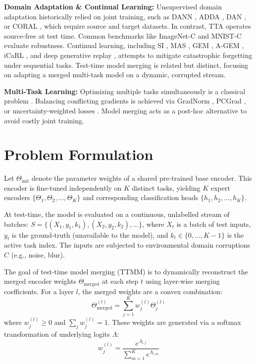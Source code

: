 \documentclass{article}
\theoremstyle{plain}
\theoremstyle{definition}
\theoremstyle{remark}
\begin{document}
\textbf{Domain Adaptation \& Continual Learning:} Unsupervised domain adaptation historically relied on joint training, such as DANN \cite{dann2016, dann_unsupervised2015}, ADDA \cite{adda2017}, DAN \cite{dan2015}, or CORAL \cite{coral2016}, which require source and target datasets. In contrast, TTA operates source-free at test time. Common benchmarks like ImageNet-C \cite{imagenetc2019} and MNIST-C \cite{mnistc2020} evaluate robustness. Continual learning, including SI \cite{si2017}, MAS \cite{mas2018}, GEM \cite{gem2017}, A-GEM \cite{agem2019}, iCaRL \cite{icarl2017}, and deep generative replay \cite{generativereplay2017}, attempts to mitigate catastrophic forgetting under sequential tasks. Test-time model merging is related but distinct, focusing on adapting a merged multi-task model on a dynamic, corrupted stream.

\textbf{Multi-Task Learning:} Optimizing multiple tasks simultaneously is a classical problem \cite{multitask1997, ruder2017}. Balancing conflicting gradients is achieved via GradNorm \cite{gradnorm2018}, PCGrad \cite{pcgrad2020}, or uncertainty-weighted losses \cite{kendall2018}. Model merging acts as a post-hoc alternative to avoid costly joint training.

\section{Problem Formulation}
Let $\Theta_{\text{init}}$ denote the parameter weights of a shared pre-trained base encoder. This encoder is fine-tuned independently on $K$ distinct tasks, yielding $K$ expert encoders $\{\Theta_1, \Theta_2, \dots, \Theta_K\}$ and corresponding classification heads $\{h_1, h_2, \dots, h_K\}$. 

At test-time, the model is evaluated on a continuous, unlabelled stream of batches: $S = \{(X_1, y_1, k_1), (X_2, y_2, k_2), \dots\}$, where $X_t$ is a batch of test inputs, $y_t$ is the ground-truth (unavailable to the model), and $k_t \in \{0, \dots, K-1\}$ is the active task index. The inputs are subjected to environmental domain corruptions $C$ (e.g., noise, blur).

The goal of test-time model merging (TTMM) is to dynamically reconstruct the merged encoder weights $\Theta_{\text{merged}}$ at each step $t$ using layer-wise merging coefficients. For a layer $l$, the merged weights are a convex combination:
\begin{equation}
\Theta_{\text{merged}}^{(l)} = \sum_{j=1}^K w_j^{(l)} \Theta_j^{(l)}
\end{equation}
where $w_j^{(l)} \ge 0$ and $\sum_j w_j^{(l)} = 1$. These weights are generated via a softmax transformation of underlying logits $\Lambda$:
\begin{equation}
w_j^{(l)} = \frac{e^{\Lambda_{l, j}}}{\sum_{m=1}^K e^{\Lambda_{l, m}}}
\end{equation}
\end{document}
